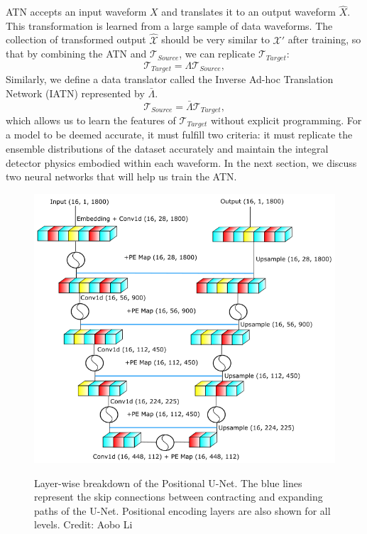 ATN accepts an input waveform $X$ and translates it to an output waveform $\hat{X}$. This transformation is learned from a large sample of data waveforms. The collection of transformed output $\hat{\mathcal{X}}$ should be very similar to $\mathcal{X}'$ after training, so that by combining the ATN and $\mathcal{T}_{Source}$, we can replicate $\mathcal{T}_{Target}$:
\begin{equation}
    \mathcal{T}_{Target}=\Lambda \mathcal{T}_{Source} ,
    \label{eqn:ATN_task}
\end{equation}
Similarly, we define a data translator called the Inverse Ad-hoc Translation Network (IATN) represented by $\bar{\Lambda}$.
\begin{equation}
    \mathcal{T}_{Source}= \bar{\Lambda} \mathcal{T}_{Target} ,
    \label{eqn:IATN_task}
\end{equation}
which allows us to learn the features of $\mathcal{T}_{Target}$ without explicit programming. For a model to be deemed accurate, it must fulfill two criteria: it must replicate the ensemble distributions of the dataset accurately and maintain the integral detector physics embodied within each waveform. In the next section, we discuss two neural networks that will help us train the ATN.


\begin{figure}[htb!]
\centering
    \includegraphics[width=0.7\linewidth]{ch6/figs/unet.png}
    \label{fig:cpunet}
    \caption{Layer-wise breakdown of the Positional U-Net. The blue lines represent the skip connections between contracting and expanding paths of the U-Net. Positional encoding layers are also shown for all levels. Credit: Aobo Li}
   \label{fig:network_schematic}
\end{figure}

